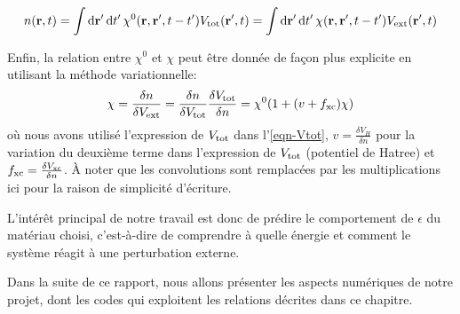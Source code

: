 \begin{equation}
  n(\vb{r}, t) = \int \dd{\vb{r}'} \dd{t'} \chi^0(\vb{r}, \vb{r}', t-t') V_{\textnormal{tot}}(\vb{r}', t)
               = \int \dd{\vb{r}'} \dd{t'} \chi(\vb{r}, \vb{r}', t-t') V_{\textnormal{ext}}(\vb{r}', t)
\end{equation}

Enfin, la relation entre $\chi^0$ et $\chi$ peut être donnée de façon plus explicite
en utilisant la méthode variationnelle:
\begin{equation}
  \label{eqn-chi0chi}
  \chi = \frac{\delta n}{\delta V_{\textnormal{ext}}}
       = \frac{\delta n}{\delta V_{\textnormal{tot}}} \frac{\delta V_{\textnormal{tot}}}{\delta n}
       = \chi^0 ( 1 + (v+f_{\textnormal{xc}})\chi)
\end{equation}
où nous avons utilisé l'expression de $V_{\textnormal{tot}}$ dans l'\cref{eqn-Vtot},
$v = \frac{\delta V_H}{\delta n}$ pour la variation du deuxième terme dans l'expression de $V_{\textnormal{tot}}$
(potentiel de Hatree) et $f_{\textnormal{xc}} = \frac{\delta V_{\textnormal{xc}}}{\delta n}$.
À noter que les convolutions sont remplacées par les multiplications ici pour la raison de simplicité d'écriture.

L'intérêt principal de notre travail est donc de prédire le comportement de $\epsilon$ du matériau choisi,
c'est-à-dire de comprendre à quelle énergie et comment le système réagit à une perturbation externe.

Dans la suite de ce rapport, nous allons présenter les aspects numériques de notre projet,
dont les codes qui exploitent les relations décrites dans ce chapitre.
